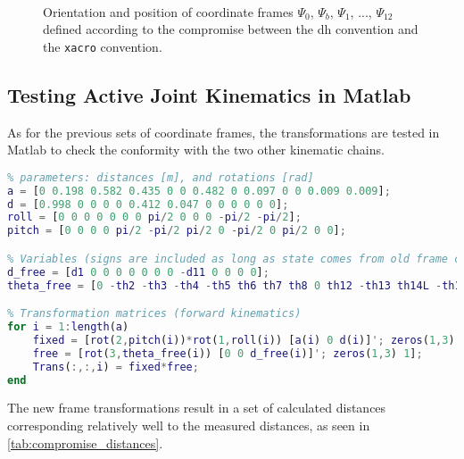\begin{figure}[htbp]
	\vspace*{-10mm}
	\hspace{-10mm}
	\vspace{5mm}\\
	\hspace*{-15mm}
	\caption{Orientation and position of coordinate frames $\Psi_0$, $\Psi_b$, $\Psi_1$, ..., $\Psi_{12}$ defined according to the compromise between the \gls{dh} convention and the \texttt{xacro} convention.}
	\label{fig:robot_compromise_frames}
\end{figure}

\subsection{Testing Active Joint Kinematics in Matlab}
As for the previous sets of coordinate frames, the transformations are tested in Matlab to check the conformity with the two other kinematic chains.

\begin{lstlisting}[language=matlab]
%% Coordinate frames defined as a compromise between DH and the xacro syntax, excluding passive joints
% parameters: distances [m], and rotations [rad]
a = [0 0.198 0.582 0.435 0 0 0.482 0 0.097 0 0 0.009 0.009];
d = [0.998 0 0 0 0 0.412 0.047 0 0 0 0 0 0];
roll = [0 0 0 0 0 0 0 pi/2 0 0 0 -pi/2 -pi/2];
pitch = [0 0 0 0 pi/2 -pi/2 pi/2 0 -pi/2 0 pi/2 0 0];

% Variables (signs are included as long as state comes from old frame convention)
d_free = [d1 0 0 0 0 0 0 0 -d11 0 0 0 0];
theta_free = [0 -th2 -th3 -th4 -th5 th6 th7 th8 0 th12 -th13 th14L -th14R];

% Transformation matrices (forward kinematics)
for i = 1:length(a)
	fixed = [rot(2,pitch(i))*rot(1,roll(i)) [a(i) 0 d(i)]'; zeros(1,3) 1];
	free = [rot(3,theta_free(i)) [0 0 d_free(i)]'; zeros(1,3) 1];
	Trans(:,:,i) = fixed*free;
end
\end{lstlisting}

The new frame transformations result in a set of calculated distances corresponding relatively well to the measured distances, as seen in \autoref{tab:compromise_distances}.

